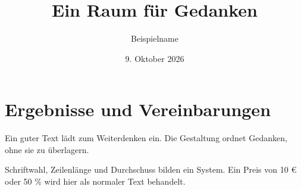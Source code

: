 \documentclass[11pt,a4paper,ngerman]{scrartcl}
\title{Ein Raum für Gedanken}
\author{Beispielname}
\date{9. Oktober 2026}
\begin{document}
\maketitle
\section*{Ergebnisse und Vereinbarungen}
Ein guter Text lädt zum Weiterdenken ein. Die Gestaltung ordnet Gedanken, ohne sie zu überlagern.

Schriftwahl, Zeilenlänge und Durchschuss bilden ein System. Ein Preis von 10 € oder 50 \% wird hier als normaler Text behandelt.
\end{document}
